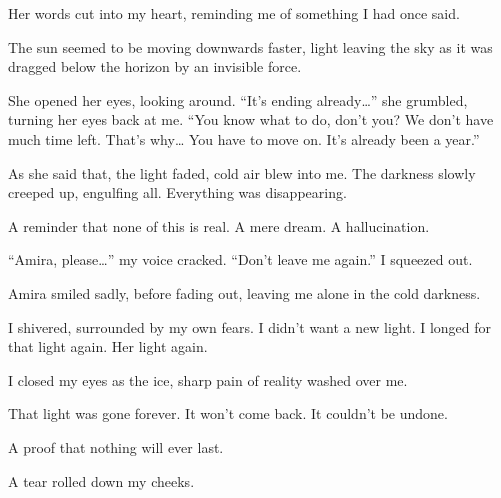 Her words cut into my heart, reminding me of something I had once said. 

The sun seemed to be moving downwards faster, light leaving the sky as it was dragged below the horizon by an invisible force.

She opened her eyes, looking around. “It's ending already…” she grumbled, turning her eyes back at me. “You know what to do, don't you? We don't have much time left. That's why… You have to move on. It's already been a year.”

As she said that, the light faded, cold air blew into me. The darkness slowly creeped up, engulfing all. Everything was disappearing. 

A reminder that none of this is real. A mere dream. A hallucination. 

“Amira, please…” my voice cracked. “Don't leave me again.” I squeezed out. 

Amira smiled sadly, before fading out, leaving me alone in the cold darkness. 

I shivered, surrounded by my own fears. I didn't want a new light. I longed for that light again. Her light again. 

I closed my eyes as the ice, sharp pain of reality washed over me.

That light was gone forever. It won't come back. It couldn't  be undone.

A proof that nothing will ever last.

A tear rolled down my cheeks.







